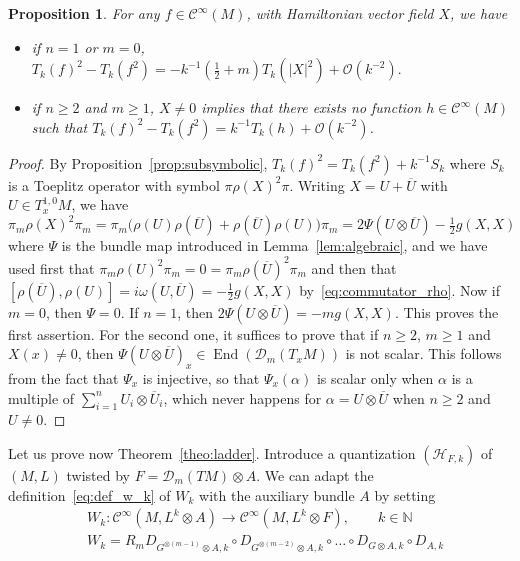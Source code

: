 \documentclass[10pt,a4paper]{article}
\newtheorem{prop}[theo]{Proposition}
\theoremstyle{definition}
\numberwithin{equation}{section}
\newcommand{\N}{{\mathbb{N}}}
\newcommand{\al}{{\alpha}}
\newcommand{\om}{{\omega}}
\newcommand{\con}{\overline}
\newcommand{\op}{\operatorname}
\newcommand{\Ci}{{\mathcal{C}}^{\infty}}
\newcommand{\bigo}{\mathcal{O}}
\newcommand{\D}{\mathcal{D}}
\newcommand{\Hilb}{\mathcal{H}}
\begin{document}
\begin{prop}\label{prop:fonction}
For any $f \in \Ci (M)$, with Hamiltonian vector field $X$, we have
\begin{itemize}
\item if $n =1$ or $m=0$, $ T_k (f)^2 - T_k (f^2) = -k^{-1} (\frac{1}{2} + m)T_k (|X|^2) + \bigo (k^{-2}).$
\item if $n \geqslant 2$ and $m \geqslant 1$, $ X \neq 0$ implies that there exists no function $h \in \Ci (M)$ such that $T_k (f)^2 - T_k (f^2) = k^{-1} T_k (h) + \bigo (k^{-2})$.
\end{itemize}
\end{prop}

\begin{proof}
By Proposition~\ref{prop:subsymbolic}, $ T_k (f)^2 = T_k (f^2) + k^{-1} S_k $ where $S_k$ is a Toeplitz operator with symbol $\pi \rho(X)^2 \pi$. Writing $X = U + \con {U}$ with $U \in T^{1,0}_xM$, we have
\[
\pi_m \rho (X)^2 \pi_m = \pi_m \bigl(\rho (U) \rho (\con{U}) + \rho
(\con {U}) \rho (U) \bigr) \pi_m = 2 \Psi (U \otimes \con{U}) - \tfrac{1}{2} g
(X,X)
\]
where $\Psi$ is the bundle map introduced in Lemma~\ref{lem:algebraic}, and we have used first that $\pi_m \rho (U) ^2 \pi_m =0 =\pi_m
\rho(\con{U})^2 \pi_m $ and then that $[\rho(\con{U}), \rho (U)] = i \om (U, \con {U}) = -\frac{1}{2} g (X,X)$ by~\eqref{eq:commutator_rho}. Now if $m=0$, then $\Psi =0$. If $n=1$, then $2 \Psi (U \otimes \con{U}) = - m g (X,X)$. This proves the first assertion. For the second one, it suffices to prove that if $n \geqslant 2$, $m \geqslant 1$ and $X(x) \neq 0$, then $\Psi (U \otimes \con{U})_x \in \op{End}(\D_m (T_xM))$ is not scalar. This follows from the fact that $\Psi_x$ is injective, so that $\Psi_x (\al) $ is scalar only when $ \al$ is a multiple of $\sum_{i=1}^{n} U_i \otimes
\con{U}_i$, which never happens for $\al = U \otimes \con{U}$ when $n
\geqslant 2$ and $U \neq 0$.
\end{proof}


Let us prove now Theorem~\ref{theo:ladder}. Introduce a quantization $(\Hilb_{F,k})$ of $(M,L)$ twisted by $F = \D_m (TM) \otimes A$. We can adapt the definition~\eqref{eq:def_w_k} of $W_k$ with the auxiliary bundle $A$ by setting
\begin{equation}\label{eq:def_w_k_A}
\begin{split}
&W_k : \Ci \left(M, L^k \otimes A\right) \rightarrow \Ci \left(M, L^k \otimes F\right), \qquad k \in \N\\
&W_k = R_m D_{G^{\otimes (m-1)} \otimes A,k} \circ D_{G^{\otimes (m-2)}\otimes A,k} \circ \ldots \circ D_{G \otimes A, k} \circ D_{A,k}
\end{split}
\end{equation}
\end{document}
